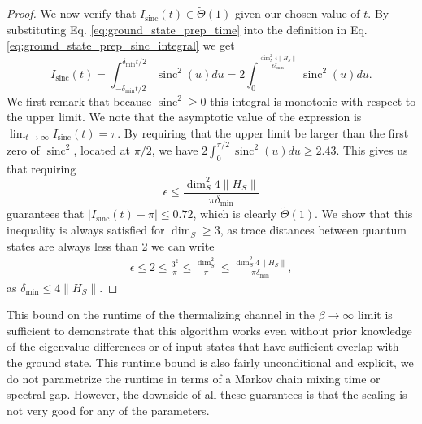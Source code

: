 \documentclass{article}
\newcommand{\norm}[1]{\| #1 \|}
\DeclareMathOperator{\sinc}{sinc}
\begin{document}
\begin{proof}
We now verify that $I_{\sinc}(t) \in \widetilde{\Theta}(1)$ given our chosen value of $t$. By substituting Eq. \eqref{eq:ground_state_prep_time} into the definition in Eq. \eqref{eq:ground_state_prep_sinc_integral} we get
\begin{equation}
    I_{\sinc}(t) = \int_{-\delta_{\min} t/2}^{\delta_{\min} t/2} \sinc^2 (u) du = 2 \int_{0}^{\frac{\dim_S^2 4 \norm{H_S}}{\epsilon \delta_{\min}}} \sinc^2 (u) du .
\end{equation}
We first remark that because $\sinc^2 \ge 0$ this integral is monotonic with respect to the upper limit. We note that the asymptotic value of the expression is $\lim_{t \to \infty} I_{\sinc}(t) = \pi$. By requiring that the upper limit be larger than the first zero of $\sinc^2$, located at $\pi / 2$, we have $2 \int_{0}^{\pi / 2} \sinc^2(u) du \ge 2.43 $. This gives us that requiring 
\begin{equation}
    \epsilon \le \frac{\dim_S^2 4 \norm{H_S}}{\pi \delta_{\min}}
\end{equation}
guarantees that $|I_{\sinc}(t) - \pi| \le 0.72 $, which is clearly $\widetilde{\Theta}(1)$. We show that this inequality is always satisfied for $\dim_S \ge 3$, as trace distances between quantum states are always less than 2 we can write
\begin{align}
    \epsilon \le 2 \le \frac{3^2}{\pi} \le \frac{\dim_S^2}{\pi} \le \frac{\dim_S^2 4 \norm{H_S}}{\pi \delta_{\min}},
\end{align}
as $\delta_{\min} \le 4 \norm{H_S}$.
\end{proof}


This bound on the runtime of the thermalizing channel in the $\beta \to \infty$ limit is sufficient to demonstrate that this algorithm works even without prior knowledge of the eigenvalue differences or of input states that have sufficient overlap with the ground state. This runtime bound is also fairly unconditional and explicit, we do not parametrize the runtime in terms of a Markov chain mixing time or spectral gap. However, the downside of all these guarantees is that the scaling is not very good for any of the parameters. 
\end{document}
